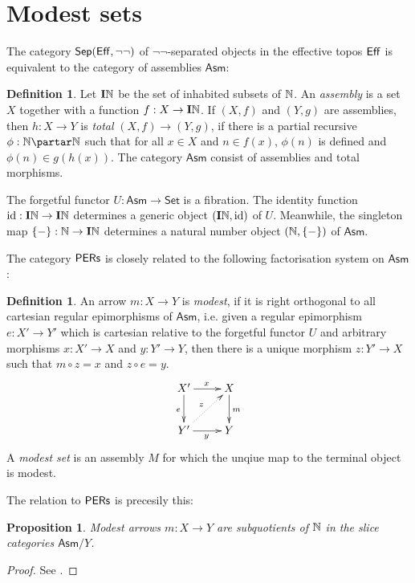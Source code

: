\documentclass[12pt, a4paper]{article}
\theoremstyle{plain}
\newtheorem{prop}[theorem]{Proposition}
\theoremstyle{definition}
\newtheorem{defin}[theorem]{Definition}
\newcommand\Cat{\mathsf}
\newcommand\id{\mathrm{id}}
\newcommand\Set{\Cat{Set}}
\begin{document}
\section{Modest sets}
\newcommand\Asm{\mathsf{Asm}}%
\newcommand\inh{\mathbf I}%
\newcommand\set[1]{\left\{#1\right\}}
The category $\mathsf{Sep}(\mathsf{Eff},\neg\neg)$ of $\neg\neg$-separated objects in the effective topos $\mathsf{Eff}$ is equivalent to the category of assemblies $\Asm$: 
\begin{defin} Let $\inh \N$ be the set of inhabited subsets of $\mathbb N$. An \emph{assembly} is a set $X$ together with a function $f:X\to \inh \N$. If $(X,f)$ and $(Y,g)$ are assemblies, then $h:X\to Y$ is \emph{total} $(X,f)\to (Y,g)$, if there is a partial recursive $\phi:\N\partar\N$ such that for all $x\in X$ and $n\in f(x)$, $\phi(n)$ is defined and $\phi(n)\in g(h(x))$. The category $\Asm$ consist of assemblies and total morphisms.
\end{defin}

The forgetful functor $U:\Asm\to \Set$ is a fibration. The identity function $\id:\inh \N\to\inh \N$ determines a generic object $(\inh \N,\id)$ of $U$. Meanwhile, the singleton map $\set-:\N \to \inh \N$ determines a natural number object $(\N,\set-)$ of $\Asm$.

The category $\mathsf{PERs}$ is closely related to the following factorisation system on $\Asm$:

\begin{defin} An arrow $m:X\to Y$ is \emph{modest}, if it is right orthogonal to all cartesian regular epimorphisms of $\Asm$, i.e. given a regular epimorphism $e:X'\to Y'$ which is cartesian relative to the forgetful functor $U$ and arbitrary morphisms $x:X'\to X$ and $y:Y'\to Y$, then there is a unique morphism $z: Y'\to X$ such that $m\circ z = x$ and $z\circ e = y$.
\[ \xymatrix{
X'\ar[d]_e\ar[r]^x & X\ar[d]^m \\
Y'\ar[r]_y\ar@{.>}[ur]^z & Y
}\]
A \emph{modest set} is an assembly $M$ for which the unqiue map to the terminal object is modest.
\end{defin}

The relation to $\mathsf{PERs}$ is precesily this:
\begin{prop} Modest arrows $m:X\to Y$ are subquotients of $\mathbb N$ in the slice categories $\Asm/Y$. \end{prop}

\begin{proof} See \cite{MR1023803}. \end{proof}
\end{document}
